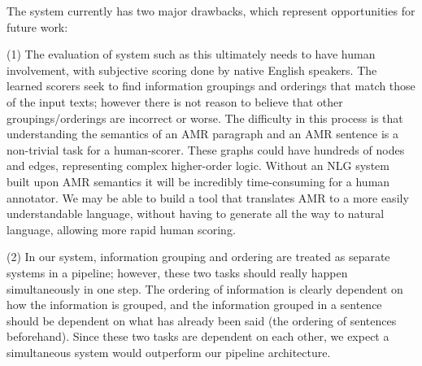 \documentclass[12pt]{article}
\begin{document}
The system currently has two major drawbacks, which represent opportunities for future work:

(1) The evaluation of system such as this ultimately needs to have human involvement, with subjective scoring done by native English speakers. The learned scorers seek to find information groupings and orderings that match those of the input texts; however there is not reason to believe that other groupings/orderings are incorrect or worse. The difficulty in this process is that understanding the semantics of an AMR paragraph and an AMR sentence is a non-trivial task for a human-scorer. These graphs could have hundreds of nodes and edges, representing complex higher-order logic. Without an NLG system built upon AMR semantics it will be incredibly time-consuming for a human annotator. We may be able to build a tool that translates AMR to a more easily understandable language, without having to generate all the way to natural language, allowing more rapid human scoring. 

(2) In our system, information grouping and ordering are treated as separate systems in a pipeline; however, these two tasks should really happen simultaneously in one step. The ordering of information is clearly dependent on how the information is grouped, and the information grouped in a sentence should be dependent on what has already been said (the ordering of sentences beforehand). Since these two tasks are dependent on each other, we expect a simultaneous system would outperform our pipeline architecture.


\pagebreak


\end{document}
